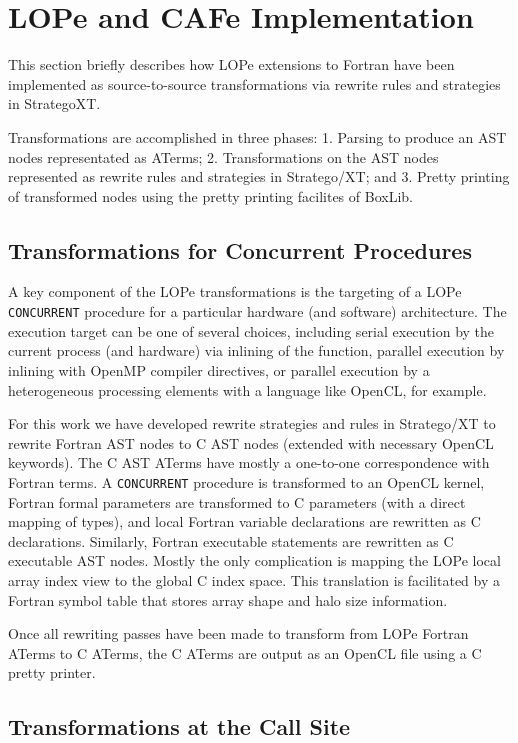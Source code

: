 \section{LOPe and CAFe Implementation}

This section briefly describes how LOPe extensions to Fortran have been implemented as
source-to-source transformations via rewrite rules and strategies in StrategoXT.

Transformations are accomplished in three phases:
1. Parsing to produce an AST nodes representated as ATerms;
2. Transformations on the AST nodes represented as rewrite rules and strategies in Stratego/XT; and
3. Pretty printing of transformed nodes using the pretty printing facilites of BoxLib.

\subsection{Transformations for Concurrent Procedures}

A key component of the LOPe transformations is the targeting of a LOPe \texttt{CONCURRENT}
procedure for a particular hardware (and software) architecture.  The execution target can be one
of several choices, including serial execution by the current process (and hardware) via inlining
of the function, parallel execution by inlining with OpenMP compiler directives, or parallel
execution by a heterogeneous processing elements with a language like OpenCL, for example.

For this work we have developed rewrite strategies and rules in Stratego/XT to rewrite Fortran AST
nodes to C AST nodes (extended with necessary OpenCL keywords).  The C AST ATerms have mostly a
one-to-one correspondence with Fortran terms.  A \texttt{CONCURRENT} procedure is transformed to an
OpenCL kernel, Fortran formal parameters are transformed to C parameters (with a direct mapping of
types), and local Fortran variable declarations are rewritten as C declarations.  Similarly,
Fortran executable statements are rewritten as C executable AST nodes.  Mostly the only
complication is mapping the LOPe local array index view to the global C index space.  This
translation is facilitated by a Fortran symbol table that stores array shape and halo size
information.

Once all rewriting passes have been made to transform from LOPe Fortran ATerms to C ATerms, the
C ATerms are output as an OpenCL file using a C pretty printer.

\subsection{Transformations at the Call Site}


